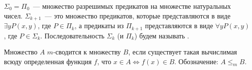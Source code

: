




\setcounter{curtask}{27}

\begin{definition*}
    $\Sigma_0 = \Pi_0$~--- множество разрешимых предикатов на множестве натуральных чисел.
    $\Sigma_{k + 1}$~--- это множество предикатов, которые представляются в виде $\exists y P(x, y)$, где
    $P \in \Pi_{k}$, а предикаты из $\Pi_{k + 1}$ представляются в виде $\forall y P(x, y)$, где $P \in
    \Sigma_{k}$. Последовательность $\Sigma_k$ (и $\Pi_k$) будем называть .
\end{definition*}


\begin{definition*}
    Множество $A$ $m$-сводится к множеству $B$, если существует такая вычислимая всюду определенная
    функция $f$, что $x \in A \Leftrightarrow f(x) \in B$. Обозначение: $A \le_m B$.
\end{definition*}



\breakline


